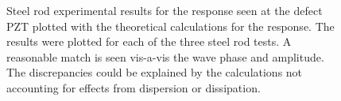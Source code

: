 \documentclass[11pt,letterpaper]{article}%
\begin{document}
 \begin{figure}
\begin{subfigmatrix}{3}
\end{subfigmatrix}

   \caption[all]
   { \label{steelThExp}
Steel rod experimental results for the response seen at the defect PZT plotted with the theoretical calculations for the response. The results were plotted for each of the three steel rod tests. A reasonable match is seen vis-a-vis the wave phase and amplitude. The discrepancies could be explained by the calculations not accounting for effects from dispersion or dissipation.
 }
 \end{figure}
\end{document}
